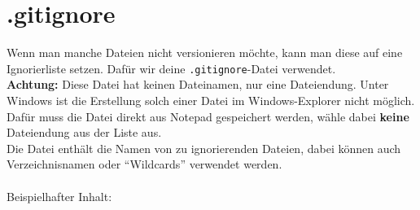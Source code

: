\documentclass[accentcolor=tud8b,colorbacktitle,12pt]{tudexercise}
\begin{document}
\section*{.gitignore}
Wenn man manche Dateien nicht versionieren möchte, kann man diese auf eine Ignorierliste setzen. Dafür wir deine \lstinline|.gitignore|-Datei verwendet.\\
\textbf{Achtung:} Diese Datei hat keinen Dateinamen, nur eine Dateiendung. Unter Windows ist die Erstellung solch einer Datei im Windows-Explorer nicht möglich. Dafür muss die Datei direkt aus Notepad gespeichert werden, wähle dabei \textbf{keine} Dateiendung aus der Liste aus.\\
Die Datei enthält die Namen von zu ignorierenden Dateien, dabei können auch Verzeichnisnamen oder "`Wildcards"' verwendet werden.\\
\\
Beispielhafter Inhalt:

\end{document}
